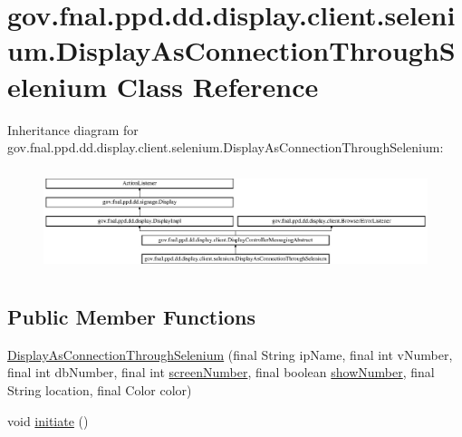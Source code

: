 \hypertarget{classgov_1_1fnal_1_1ppd_1_1dd_1_1display_1_1client_1_1selenium_1_1DisplayAsConnectionThroughSelenium}{\section{gov.\-fnal.\-ppd.\-dd.\-display.\-client.\-selenium.\-Display\-As\-Connection\-Through\-Selenium Class Reference}
\label{classgov_1_1fnal_1_1ppd_1_1dd_1_1display_1_1client_1_1selenium_1_1DisplayAsConnectionThroughSelenium}
}
Inheritance diagram for gov.\-fnal.\-ppd.\-dd.\-display.\-client.\-selenium.\-Display\-As\-Connection\-Through\-Selenium\-:\begin{figure}[H]
\begin{center}
\leavevmode
\includegraphics[height=3.023758cm]{classgov_1_1fnal_1_1ppd_1_1dd_1_1display_1_1client_1_1selenium_1_1DisplayAsConnectionThroughSelenium}
\end{center}
\end{figure}
\subsection*{Public Member Functions}
\begin{DoxyCompactItemize}
\item 
\hyperlink{classgov_1_1fnal_1_1ppd_1_1dd_1_1display_1_1client_1_1selenium_1_1DisplayAsConnectionThroughSelenium_abb5c9f83153fe7d81a5dcf2c8dd88e67}{Display\-As\-Connection\-Through\-Selenium} (final String ip\-Name, final int v\-Number, final int db\-Number, final int \hyperlink{classgov_1_1fnal_1_1ppd_1_1dd_1_1display_1_1DisplayImpl_ace620614bde13cee492129c27f38db4e}{screen\-Number}, final boolean \hyperlink{classgov_1_1fnal_1_1ppd_1_1dd_1_1display_1_1client_1_1DisplayControllerMessagingAbstract_aca138d2835d0f3794bc86261ad550f18}{show\-Number}, final String location, final Color color)
\item 
void \hyperlink{classgov_1_1fnal_1_1ppd_1_1dd_1_1display_1_1client_1_1selenium_1_1DisplayAsConnectionThroughSelenium_ab305c221b590a686a18f4bd7072cf730}{initiate} ()
\end{DoxyCompactItemize}
